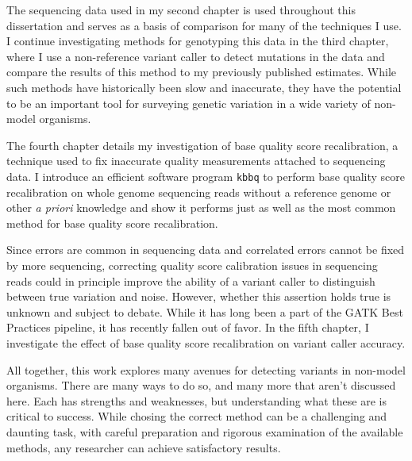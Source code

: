The sequencing data used in my second chapter is used throughout this dissertation and serves as a basis of comparison for many of the techniques I use.
I continue investigating methods for genotyping this data in the third chapter, where I use a non-reference variant caller to detect mutations in the data and compare the results of this method to my previously published estimates. While such methods have historically been slow and inaccurate, they have the potential to be an important tool for surveying genetic variation in a wide variety of non-model organisms.

The fourth chapter details my investigation of base quality score recalibration, a technique used to fix inaccurate quality measurements attached to sequencing data. I introduce an efficient software program \texttt{kbbq} to perform base quality score recalibration on whole genome sequencing reads without a reference genome or other \textit{a priori} knowledge and show it performs just as well as the most common method for base quality score recalibration.

Since errors are common in sequencing data and correlated errors cannot be fixed by more sequencing, correcting quality score calibration issues in sequencing reads could in principle improve the ability of a variant caller to distinguish between true variation and noise. However, whether this assertion holds true is unknown and subject to debate. While it has long been a part of the GATK Best Practices pipeline, it has recently fallen out of favor. In the fifth chapter, I investigate the effect of base quality score recalibration on variant caller accuracy.

All together, this work explores many avenues for detecting variants in non-model organisms. 
There are many ways to do so, and many more that aren't discussed here.
Each has strengths and weaknesses, but understanding what these are is critical to success.
While chosing the correct method can be a challenging and daunting task, with careful preparation and rigorous examination of the available methods, any researcher can achieve satisfactory results.

